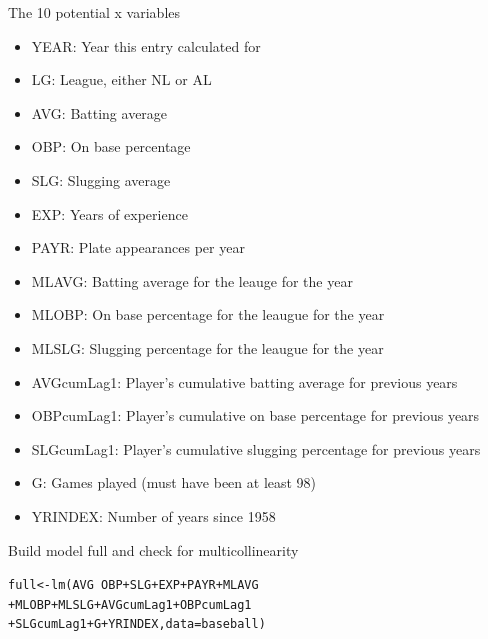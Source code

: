 \documentclass{beamer}\usepackage[]{graphicx}\usepackage[]{color}
\makeatletter
\newcommand{\hlopt}[1]{\textcolor[rgb]{1,0.894,0.769}{#1}}%
\newcommand{\hlstd}[1]{\textcolor[rgb]{1,0.894,0.769}{#1}}%
\newcommand{\hlkwb}[1]{\textcolor[rgb]{0.804,0.776,0.451}{#1}}%
\newcommand{\hlkwc}[1]{\textcolor[rgb]{0.78,0.941,0.545}{#1}}%
\newcommand{\hlkwd}[1]{\textcolor[rgb]{1,0.78,0.769}{#1}}%
\newenvironment{kframe}{%
 \def\at@end@of@kframe{}%
 \ifinner\ifhmode%
  \def\at@end@of@kframe{\end{minipage}}%
  \begin{minipage}{\columnwidth}%
 \fi\fi%
 \def\FrameCommand##1{\hskip\@totalleftmargin \hskip-\fboxsep
 \colorbox{shadecolor}{##1}\hskip-\fboxsep
     \hskip-\linewidth \hskip-\@totalleftmargin \hskip\columnwidth}%
 \MakeFramed {\advance\hsize-\width
   \@totalleftmargin\z@ \linewidth\hsize
   \@setminipage}}%
 {\par\unskip\endMakeFramed%
 \at@end@of@kframe}
\newenvironment{knitrout}{}{} %
\makeatother
\begin{document}
\begin{darkframes}
    \begin{frame}[fragile]{The 10 potential x variables}
    \fontsize{10}{10}\selectfont
          \begin{itemize}
            \item YEAR:    Year this entry calculated for 
            \item LG:      League, either NL or AL
            \item AVG:     Batting average
            \item OBP:     On base percentage
            \item SLG:     Slugging average
            \item EXP:     Years of experience
            \item PAYR:    Plate appearances per year
            \item MLAVG:   Batting average for the leauge for the year
            \item MLOBP:   On base percentage for the leaugue for the year
            \item MLSLG:   Slugging percentage for the leaugue for the year
            \item AVGcumLag1:   Player's cumulative batting average for previous years
            \item OBPcumLag1:   Player's cumulative on base percentage for previous years
            \item SLGcumLag1:   Player's cumulative slugging percentage for previous years
            \item G:       Games played (must have been at least 98)
            \item YRINDEX: Number of years since 1958
          \end{itemize}

        \lc %
    \end{frame}


    \begin{frame}[fragile]{Build model full and check for multicollinearity}
      \fontsize{8}{8}\selectfont  

\begin{knitrout}
\begin{kframe}
\begin{alltt}
\hlstd{full} \hlkwb{<-} \hlkwd{lm}\hlstd{(AVG} \hlopt{~} \hlstd{OBP} \hlopt{+} \hlstd{SLG} \hlopt{+} \hlstd{EXP} \hlopt{+} \hlstd{PAYR} \hlopt{+} \hlstd{MLAVG}
\hlopt{+} \hlstd{MLOBP} \hlopt{+} \hlstd{MLSLG} \hlopt{+} \hlstd{AVGcumLag1} \hlopt{+} \hlstd{OBPcumLag1}
\hlopt{+} \hlstd{SLGcumLag1} \hlopt{+} \hlstd{G} \hlopt{+} \hlstd{YRINDEX,} \hlkwc{data}\hlstd{=baseball)}


\end{alltt}
\end{kframe}
\end{knitrout}
\end{frame}
\end{darkframes}
\end{document}
